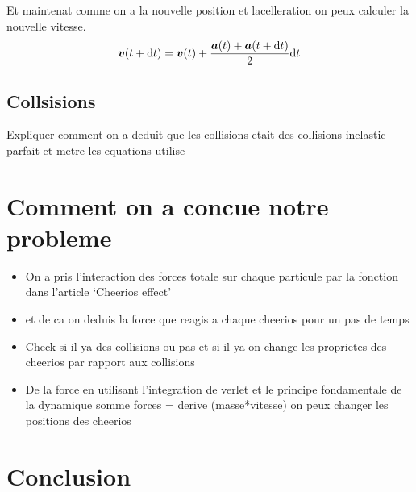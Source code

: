 \documentclass[a4paper, 11pt, oneside]{article} %
\newcommand{\dd}[1]{\mathrm{d}#1}
\begin{document}
    Et maintenat comme on a la nouvelle position et lacelleration on peux calculer la nouvelle vitesse.
    \begin{equation}
        \label{veletVitesse}
        \vb*{v}(t+\dd t) = \vb*{v}(t)+\frac{\vb*{a}(t)+\vb*{a}(t+\dd t)}{2}\dd t 
    \end{equation}



    \subsection{Collsisions}
    Expliquer comment on a deduit que les collisions etait des collisions inelastic parfait et metre les equations utilise

\section{Comment on a concue notre probleme}
    \begin{itemize}
        \item On a pris l'interaction des forces totale sur chaque particule par la fonction dans l'article `Cheerios effect'
        \item et de ca on deduis la force que reagis a chaque cheerios pour un pas de temps 
        \item Check si il ya des collisions ou pas et si il ya on change les proprietes des cheerios par rapport aux collisions
        \item De la force en utilisant l'integration de verlet et le principe fondamentale de la dynamique somme forces = derive (masse*vitesse) on peux changer les positions des cheerios
    \end{itemize}
\section*{Conclusion}

\newpage
\thispagestyle{empty}
\nocite{*}
\printbibliography[title = Bibliographie]
\end{document}
